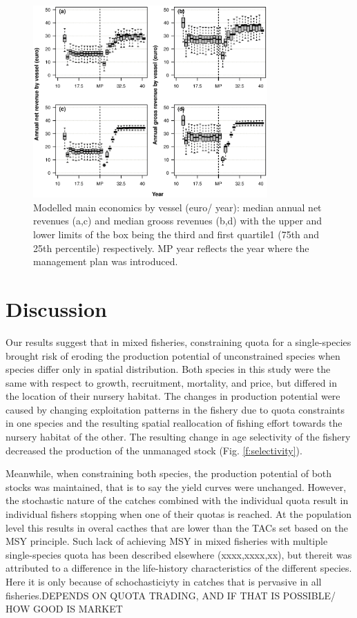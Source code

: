 \documentclass[12pt,oneline,a4paper,numbib]{ouparticle}
\numberwithin{equation}{subsection} %
\begin{document}
\begin{figure}[!ht]
\centering
\includegraphics[width=0.8\textwidth]{Figures/Mean_Economics.eps} 
\caption{Modelled main economics by vessel (euro/ year): median annual net revenues (a,c) and median grooss revenues (b,d) with the upper and lower limits of the box being the third and first quartile1 (75th and 25th percentile) respectively. MP year reflects the year where the management plan was introduced.}
\label{f:meanecon}
\end{figure}

\section{Discussion}


Our results suggest that in mixed fisheries, constraining quota for a single-species brought risk of eroding the production potential of unconstrained species when species differ only in spatial distribution. Both species in this study were the same with respect to growth, recruitment, mortality, and price, but differed in the location of their nursery habitat. The changes in production potential were caused by changing exploitation patterns in the fishery due to quota constraints in one species and the resulting spatial reallocation of fishing effort towards the nursery habitat of the other. The resulting change in age selectivity of the fishery decreased the production of the unmanaged stock (Fig. \ref{f:selectivity}). 

Meanwhile, when constraining both species, the production potential of both stocks was maintained, that is to say the yield curves were unchanged. However, the stochastic nature of the catches combined with the individual quota result in individual fishers stopping when one of their quotas is reached. At the population level this results in overal cacthes that are lower than the TACs set based on the MSY principle. Such lack of achieving MSY in mixed fisheries with multiple single-species quota has been described elsewhere (xxxx,xxxx,xx), but thereit was attributed to a difference in the life-history characteristics of the different species. Here it is only because of schochasticiyty in catches that is pervasive in all fisheries.DEPENDS ON QUOTA TRADING, AND IF THAT IS POSSIBLE/ HOW GOOD IS MARKET 
\end{document}
